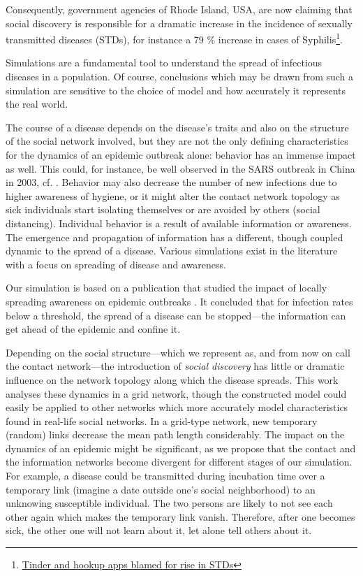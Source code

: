 \documentclass[11pt]{article}
\begin{document}
Consequently, government agencies of Rhode Island, USA, are now claiming that social discovery is responsible for a dramatic increase in the incidence of sexually transmitted diseases (STDs), for instance a 79 \% increase in cases of Syphilis\footnote{\href{http://money.cnn.com/2015/05/26/technology/rhode-island-tinder-stds/index.html}{Tinder and hookup apps blamed for rise in STDs}}.

Simulations are a fundamental tool to understand the spread of infectious diseases in a population.
Of course, conclusions which may be drawn from such a simulation are sensitive to the choice of model and how accurately it represents the real world.

The course of a disease depends on the disease's traits and also on the structure of the social network involved, but they are not the only defining characteristics for the dynamics of an epidemic outbreak alone: behavior has an immense impact as well.
This could, for instance, be well observed in the SARS outbreak in China in 2003, cf. \citep{Riley}.
Behavior may also decrease the number of new infections due to higher awareness of hygiene, or it might alter the contact network topology as sick individuals start isolating themselves or are avoided by others (social distancing).
Individual behavior is a result of available information or awareness.
The emergence and propagation of information has a different, though coupled dynamic to the spread of a disease.
Various simulations exist in the literature with a focus on spreading of disease and awareness.

Our simulation is based on a publication that studied the impact of locally spreading awareness on epidemic outbreaks \citep{Funk}.
It concluded that for infection rates below a threshold, the spread of a disease can be stopped---the information can get ahead of the epidemic and confine it.

Depending on the social structure---which we represent as, and from now on call the contact network---the introduction of \textit{social discovery} has little or dramatic influence on the network topology along which the disease spreads.
This work analyses these dynamics in a grid network, though the constructed model could easily be applied to other networks which more accurately model characteristics found in real-life social networks.
In a grid-type network, new temporary (random) links decrease the mean path length considerably.
The impact on the dynamics of an epidemic might be significant, as we propose that the contact and the information networks become divergent for different stages of our simulation.
For example, a disease could be transmitted during incubation time over a temporary link (imagine a date outside one's social neighborhood) to an unknowing susceptible individual.
The two persons are likely to not see each other again which makes the temporary link vanish.
Therefore, after one becomes sick, the other one will not learn about it, let alone tell others about it.
\end{document}
